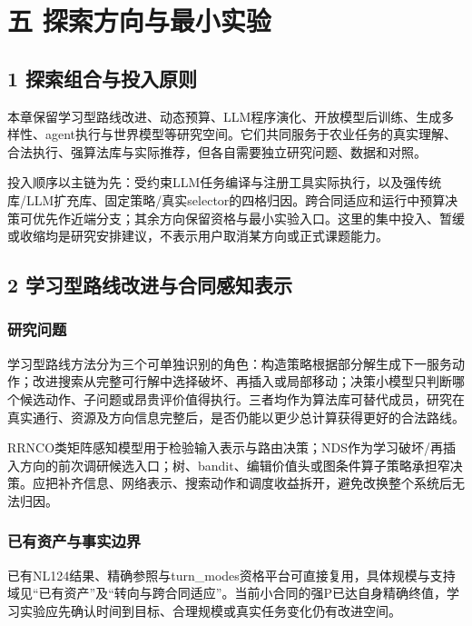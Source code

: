 \documentclass[11pt,a4paper]{article}
\newcommand{\bodytext}[1]{#1\par}
\begin{document}
\section{五 探索方向与最小实验}
\subsection{1  探索组合与投入原则}
\bodytext{本章保留学习型路线改进、动态预算、LLM程序演化、开放模型后训练、生成多样性、agent执行与世界模型等研究空间。它们共同服务于农业任务的真实理解、合法执行、强算法库与实际推荐，但各自需要独立研究问题、数据和对照。}
\bodytext{投入顺序以主链为先：受约束LLM任务编译与注册工具实际执行，以及强传统库/\allowbreak{}LLM扩充库、固定策略/\allowbreak{}真实selector的四格归因。跨合同适应和运行中预算决策可优先作近端分支；其余方向保留资格与最小实验入口。这里的集中投入、暂缓或收缩均是研究安排建议，不表示用户取消某方向或正式课题能力。}
\subsection{2  学习型路线改进与合同感知表示}
\subsubsection{研究问题}
\bodytext{学习型路线方法分为三个可单独识别的角色：构造策略根据部分解生成下一服务动作；改进搜索从完整可行解中选择破坏、再插入或局部移动；决策小模型只判断哪个候选动作、子问题或昂贵评价值得执行。三者均作为算法库可替代成员，研究在真实通行、资源及方向信息完整后，是否仍能以更少总计算获得更好的合法路线。}
\bodytext{RRNCO类矩阵感知模型用于检验输入表示与路由决策；NDS作为学习破坏/\allowbreak{}再插入方向的前次调研候选入口；树、bandit、编辑价值头或图条件算子策略承担窄决策。应把补齐信息、网络表示、搜索动作和调度收益拆开，避免改换整个系统后无法归因。}
\subsubsection{已有资产与事实边界}
\bodytext{已有NL124结果、精确参照与turn\_\allowbreak{}modes资格平台可直接复用，具体规模与支持域见“已有资产”及“转向与跨合同适应”。当前小合同的强P已达自身精确终值，学习实验应先确认时间到目标、合理规模或真实任务变化仍有改进空间。}
\end{document}
